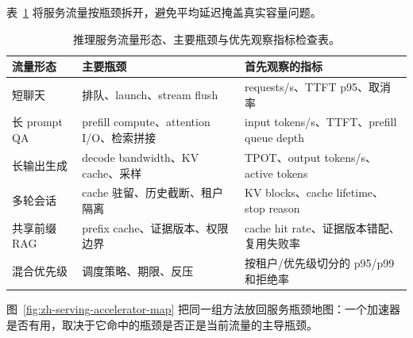 \documentclass[UTF8,zihao=-4,openany]{ctexbook}
\begin{document}
表~\ref{tab:zh-serving-traffic-bottlenecks} 将服务流量按瓶颈拆开，避免平均延迟掩盖真实容量问题。

\begin{table}[t]
\centering
\small
\setlength{\tabcolsep}{3pt}
\begin{tabular}{@{}p{}p{}p{}@{}}
\toprule
流量形态 & 主要瓶颈 & 首先观察的指标 \\
\midrule
短聊天 & 排队、launch、stream flush & requests/s、TTFT p95、取消率 \\
长 prompt QA & prefill compute、attention I/O、检索拼接 & input tokens/s、TTFT、prefill queue depth \\
长输出生成 & decode bandwidth、KV cache、采样 & TPOT、output tokens/s、active tokens \\
多轮会话 & cache 驻留、历史截断、租户隔离 & KV blocks、cache lifetime、stop reason \\
共享前缀 RAG & prefix cache、证据版本、权限边界 & cache hit rate、证据版本错配、复用失败率 \\
混合优先级 & 调度策略、期限、反压 & 按租户/优先级切分的 p95/p99 和拒绝率 \\
\bottomrule
\end{tabular}
\caption{推理服务流量形态、主要瓶颈与优先观察指标检查表。}
\label{tab:zh-serving-traffic-bottlenecks}
\end{table}

图~\ref{fig:zh-serving-accelerator-map} 把同一组方法放回服务瓶颈地图：一个加速器是否有用，取决于它命中的瓶颈是否正是当前流量的主导瓶颈。
\end{document}
